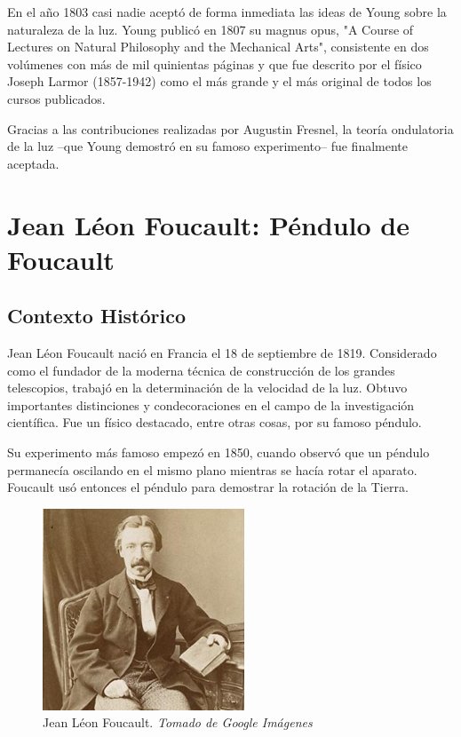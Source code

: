 \documentclass[journal]{IEEEtran}
\begin{document}
En el año 1803 casi nadie aceptó de forma inmediata las ideas de Young sobre la naturaleza de la luz. Young publicó en 1807 su magnus opus, "A Course of Lectures on Natural Philosophy and the Mechanical Arts", consistente en dos volúmenes con más de mil quinientas páginas y que fue descrito por el físico Joseph Larmor (1857-1942) como el más grande y el más original de todos los cursos publicados.

Gracias a las contribuciones realizadas por Augustin Fresnel, la teoría ondulatoria de la luz –que Young demostró en su famoso experimento– fue finalmente aceptada.





\hfill \break
\section{Jean Léon Foucault: Péndulo de Foucault}

\subsection{Contexto Histórico}

Jean Léon Foucault nació en Francia el 18 de septiembre de 1819. Considerado como el fundador de la moderna técnica de construcción de los grandes telescopios, trabajó en la determinación de la velocidad de la luz. Obtuvo importantes distinciones y condecoraciones en el campo de la investigación científica. Fue un físico destacado, entre otras cosas, por su famoso péndulo.

Su experimento más famoso empezó en 1850, cuando observó que un péndulo permanecía oscilando en el mismo plano mientras se hacía rotar el aparato. Foucault usó entonces el péndulo para demostrar la rotación de la Tierra.


\begin{center}
  \begin{figure}[h!]
  \includegraphics[width=60mm]{leon_fourt.jpg}
  \caption{Jean Léon Foucault. \emph{Tomado de Google Imágenes}}
  \end{figure}
\end{center}
\end{document}
